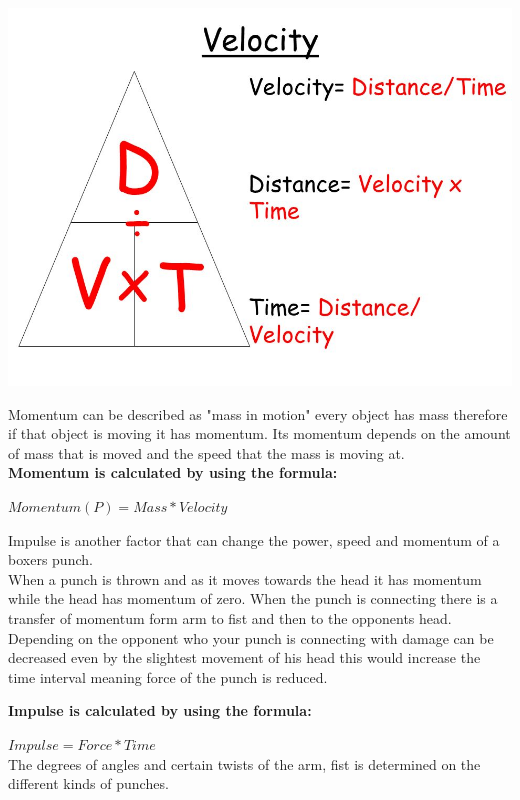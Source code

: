 \documentclass[a4paper,12pt,twoside]{report}
\begin{document}
\begin{center}
\includegraphics[scale=.3]{images/Velocity.jpeg}
\end{center}

Momentum can be described as "mass in motion" every object has mass therefore if that object is moving it has momentum. Its momentum depends on the amount of mass that is moved and the speed that the mass is moving at.\\

\textbf{Momentum is calculated by using the formula:}

$Momentum (P) = Mass * Velocity$

Impulse is another factor that can change the power, speed and momentum of a boxers punch. \\
When a punch is thrown and as it moves towards the head it has momentum while the head has momentum of zero.
When the punch is connecting there is a transfer of momentum form arm to fist and then to the opponents head. \\
Depending on the opponent who your punch is connecting with damage can be decreased even by the slightest movement of his head this would increase the time interval meaning force of the punch is reduced. 

\textbf{Impulse is calculated by using the formula:}

$Impulse = Force * Time$ \cite{boxingPhysics}\\

The degrees of angles and certain twists of the arm, fist is determined on the different kinds of punches.
\end{document}
